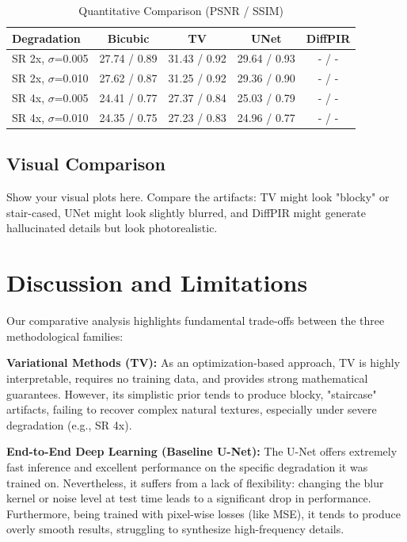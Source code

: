 \documentclass[10pt,journal,compsoc]{IEEEtran}
\begin{document}
\begin{table}[h]
\centering
\caption{Quantitative Comparison (PSNR / SSIM)}
\label{tab:metrics}
\begin{tabular}{@{}lcccc@{}}
\toprule
\textbf{Degradation} & \textbf{Bicubic} & \textbf{TV} & \textbf{UNet} & \textbf{DiffPIR} \\ \midrule
SR 2x, $\sigma$=0.005 & 27.74 / 0.89 & 31.43 / 0.92 & 29.64 / 0.93 & - / - \\
SR 2x, $\sigma$=0.010 & 27.62 / 0.87 & 31.25 / 0.92 & 29.36 / 0.90 & - / - \\
SR 4x, $\sigma$=0.005 & 24.41 / 0.77 & 27.37 / 0.84 & 25.03 / 0.79 & - / - \\
SR 4x, $\sigma$=0.010 & 24.35 / 0.75 & 27.23 / 0.83 & 24.96 / 0.77 & - / - \\ \bottomrule
\end{tabular}
\end{table}

\subsection{Visual Comparison}
Show your visual plots here. Compare the artifacts: TV might look "blocky" or stair-cased, UNet might look slightly blurred, and DiffPIR might generate hallucinated details but look photorealistic.


\section{Discussion and Limitations}
Our comparative analysis highlights fundamental trade-offs between the three methodological families:

\textbf{Variational Methods (TV):} As an optimization-based approach, TV is highly interpretable, requires no training data, and provides strong mathematical guarantees. However, its simplistic prior tends to produce blocky, "staircase" artifacts, failing to recover complex natural textures, especially under severe degradation (e.g., SR 4x).

\textbf{End-to-End Deep Learning (Baseline U-Net):} The U-Net offers extremely fast inference and excellent performance on the specific degradation it was trained on. Nevertheless, it suffers from a lack of flexibility: changing the blur kernel or noise level at test time leads to a significant drop in performance. Furthermore, being trained with pixel-wise losses (like MSE), it tends to produce overly smooth results, struggling to synthesize high-frequency details.
\end{document}
